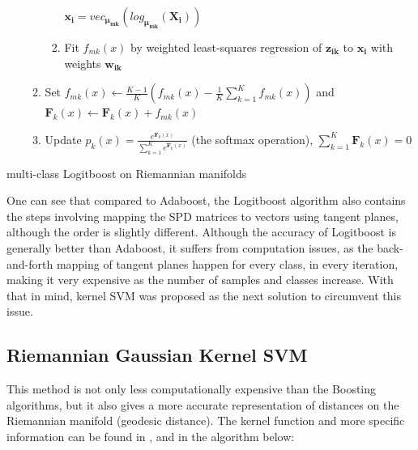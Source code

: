 \documentclass[12pt]{article}
\DeclareMathOperator*{\argmax}{arg\,max}
\begin{document}
\begin{sloppypar}
\begin{algorithm}[H]
\begin{enumerate}
\begin{enumerate}
\begin{enumerate}
                    \hspace{0.1cm} $\bm{x_{i}} = vec_{\bm{\mu_{mk}}} (log_{\bm{\mu_{mk}}}(\bm{X_{i}}))$\\
                    \item Fit $f_{mk}(x)$ by weighted least-squares regression of $\bm{z_{ik}}$ to $\bm{x_{i}}$ with weights $\bm{w_{ik}}$\\
                \end{enumerate}
            \item Set $f_{mk}(x) \leftarrow \frac{K - 1}{K} (f_{mk}(x) - \frac{1}{K} \sum_{k=1}^{K} f_{mk}(x))$ and $\bm{F}_{k}(x) \leftarrow \bm{F}_{k}(x) + f_{mk}(x)$
            \item Update $p_{k}(x) = \frac{e^{\bm{F}_{k}(x)}}{\sum_{k=1}^{K} e^{\bm{F}_{k}(x)}}$ (the softmax operation), $\sum_{k=1}^{K} \bm{F}_{k}(x) = 0$
        \end{enumerate}
    \end{enumerate}
    \KwOut{The classifier $\argmax_k \bm{F}_{k}(x)$}
    \caption{multi-class Logitboost on Riemannian manifolds}
\end{algorithm}
\vspace{5mm}
\noindent
One can see that compared to Adaboost, the Logitboost algorithm also contains the steps involving mapping the SPD matrices to vectors using tangent planes, although the order is slightly different. Although the accuracy of Logitboost is generally better than Adaboost, it suffers from computation issues, as the back-and-forth mapping of tangent planes happen for every class, in every iteration, making it very expensive as the number of samples and classes increase. With that in mind, kernel SVM was proposed as the next solution to circumvent this issue.


\subsection{Riemannian Gaussian Kernel SVM}
This method is not only less computationally expensive than the Boosting algorithms, but it also gives a more accurate representation of distances on the Riemannian manifold (geodesic distance). The kernel function and more specific information can be found in \cite{ped_detection}, and in the algorithm below: \\


\end{sloppypar}
\end{document}
